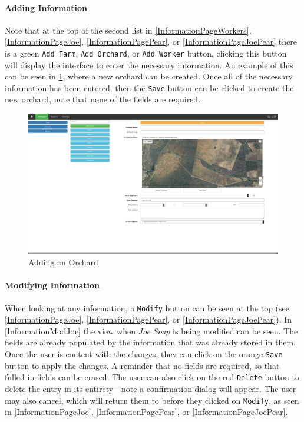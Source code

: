 \documentclass[11pt]{article}
\begin{document}
\paragraph{Adding Information}Note that at the top of the second list in \ref{InformationPageWorkers}, \ref{InformationPageJoe}, \ref{InformationPagePear}, or \ref{InformationPageJoePear} there is a green \texttt{Add Farm}, \texttt{Add Orchard}, or \texttt{Add Worker} button, clicking this button will display the interface to enter the necessary information. An example of this can be seen in \ref{InformationAddOrchard}, where a new orchard can be created. Once all of the necessary information has been entered, then the \texttt{Save} button can be clicked to create the new orchard, note that none of the fields are required.

\begin{figure}
 \centering
 \includegraphics[width=12cm, keepaspectratio]{Images/webInformation-AddOrchard.png}
 \caption{Adding an Orchard}
 \label{InformationAddOrchard}
\end{figure}

\paragraph{Modifying Information}When looking at any information, a \texttt{Modify} button can be seen at the top (see \ref{InformationPageJoe}, \ref{InformationPagePear}, or \ref{InformationPageJoePear}). In \ref{InformationModJoe} the view when \textit{Joe Soap} is being modified can be seen. The fields are already populated by the information that was already stored in them. Once the user is content with the changes, they can click on the orange \texttt{Save} button to apply the changes. A reminder that no fields are required, so that fulled in fields can be erased. The user can also click on the red \texttt{Delete} button to delete the entry in its entirety---note a confirmation dialog will appear. The user may also cancel, which will return them to before they clicked on \texttt{Modify}, as seen in \ref{InformationPageJoe}, \ref{InformationPagePear}, or \ref{InformationPageJoePear}.
\end{document}
